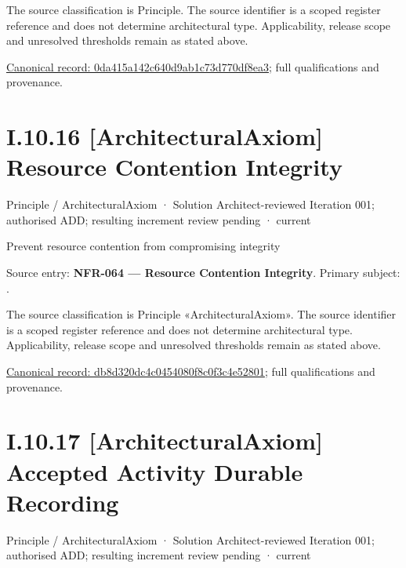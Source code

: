 The source classification is Principle. The source identifier is a scoped register reference and does not determine architectural type. Applicability, release scope and unresolved thresholds remain as stated above.


{\footnotesize \href{../../../../../../../continuum/motivation/principle/0da415a142c640d9ab1c73d770df8ea3.md}{Canonical record: 0da415a142c640d9ab1c73d770df8ea3}; full qualifications and provenance.}\par
\section*{I.10.16 [ArchitecturalAxiom] Resource Contention Integrity}
\label{navigation:I.10.16}

\label{element:db8d320dc4c0454080f8c0f3c4e52801}
{\small Principle / ArchitecturalAxiom · Solution Architect-reviewed Iteration 001; authorised ADD; resulting increment review pending · current}\par

Prevent resource contention from compromising integrity



Source entry: \textbf{NFR-064 — Resource Contention Integrity}. Primary subject: \texttt{}.



The source classification is Principle «ArchitecturalAxiom». The source identifier is a scoped register reference and does not determine architectural type. Applicability, release scope and unresolved thresholds remain as stated above.


{\footnotesize \href{../../../../../../../continuum/motivation/principle/architectural-axiom/db8d320dc4c0454080f8c0f3c4e52801.md}{Canonical record: db8d320dc4c0454080f8c0f3c4e52801}; full qualifications and provenance.}\par
\section*{I.10.17 [ArchitecturalAxiom] Accepted Activity Durable Recording}
\label{navigation:I.10.17}

\label{element:6ee491b8c08d41868c3a7652fb794756}
{\small Principle / ArchitecturalAxiom · Solution Architect-reviewed Iteration 001; authorised ADD; resulting increment review pending · current}\par

